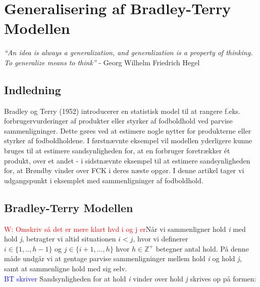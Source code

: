 \documentclass[11pt,a4paper]{article}
\begin{document}
\section{Generalisering af Bradley-Terry Modellen}
\textit{“An idea is always a generalization, and generalization is a property of thinking. To generalize means to think”} - Georg Wilhelm Friedrich Hegel
\subsection{Indledning}
Bradley og Terry (1952) introducerer en statistisk model til at rangere f.eks. forbrugervurderinger af produkter eller styrker af fodboldhold ved parvise sammenligninger. Dette gøres ved at estimere nogle nytter for produkterne eller styrker af fodboldholdene. I førstnævnte eksempel vil modellen yderligere kunne bruges til at estimere sandsynligheden for, at en forbruger foretrækker ét produkt, over et andet - i sidstnævnte eksempel til at estimere sandsynligheden for, at Brøndby vinder over FCK i deres næste opgør. I denne artikel tager vi udgangspunkt i eksemplet med sammenligninger af fodboldhold. 

\subsection{Bradley-Terry Modellen}
\textcolor{red}{W: Omskriv så det er mere klart hvd i og j er}Når vi sammenligner hold \textit{i} med hold \textit{j}, betragter vi altid situationen $i<j$, hvor vi definerer \\$i \in \{1,..,h-1\}$ og $j\in \{i+1,...,h\}$ hvor $h\in \mathbb{Z}^+$ betegner antal hold. På denne måde undgår vi at gentage parvise sammenligninger mellem hold \textit{i} og hold \textit{j}, samt at sammenligne hold med sig selv.\\
\textcolor{blue}{BT skriver} Sandsynligheden for at hold \textit{i} vinder over hold \textit{j} skrives op på formen:
\end{document}
